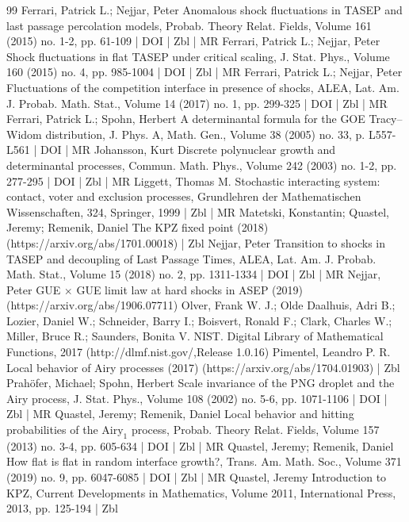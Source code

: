 \begin{thebibliography}{99}
Ferrari, Patrick L.; Nejjar, Peter Anomalous shock fluctuations in TASEP and last passage percolation models, Probab. Theory Relat. Fields, Volume 161 (2015) no. 1-2, pp. 61-109 | DOI | Zbl | MR
Ferrari, Patrick L.; Nejjar, Peter Shock fluctuations in flat TASEP under critical scaling, J. Stat. Phys., Volume 160 (2015) no. 4, pp. 985-1004 | DOI | Zbl | MR
Ferrari, Patrick L.; Nejjar, Peter Fluctuations of the competition interface in presence of shocks, ALEA, Lat. Am. J. Probab. Math. Stat., Volume 14 (2017) no. 1, pp. 299-325 | DOI | Zbl | MR
Ferrari, Patrick L.; Spohn, Herbert A determinantal formula for the GOE Tracy–Widom distribution, J. Phys. A, Math. Gen., Volume 38 (2005) no. 33, p. L557-L561 | DOI | MR
Johansson, Kurt Discrete polynuclear growth and determinantal processes, Commun. Math. Phys., Volume 242 (2003) no. 1-2, pp. 277-295 | DOI | Zbl | MR
Liggett, Thomas M. Stochastic interacting system: contact, voter and exclusion processes, Grundlehren der Mathematischen Wissenschaften, 324, Springer, 1999 | Zbl | MR
Matetski, Konstantin; Quastel, Jeremy; Remenik, Daniel The KPZ fixed point (2018) (https://arxiv.org/abs/1701.00018) | Zbl
Nejjar, Peter Transition to shocks in TASEP and decoupling of Last Passage Times, ALEA, Lat. Am. J. Probab. Math. Stat., Volume 15 (2018) no. 2, pp. 1311-1334 | DOI | Zbl | MR
Nejjar, Peter GUE $\times $ GUE limit law at hard shocks in ASEP (2019) (https://arxiv.org/abs/1906.07711)
Olver, Frank W. J.; Olde Daalhuis, Adri B.; Lozier, Daniel W.; Schneider, Barry I.; Boisvert, Ronald F.; Clark, Charles W.; Miller, Bruce R.; Saunders, Bonita V. NIST. Digital Library of Mathematical Functions, 2017 (http://dlmf.nist.gov/,Release 1.0.16)
Pimentel, Leandro P. R. Local behavior of Airy processes (2017) (https://arxiv.org/abs/1704.01903) | Zbl
Prahöfer, Michael; Spohn, Herbert Scale invariance of the PNG droplet and the Airy process, J. Stat. Phys., Volume 108 (2002) no. 5-6, pp. 1071-1106 | DOI | Zbl | MR
Quastel, Jeremy; Remenik, Daniel Local behavior and hitting probabilities of the $\text{Airy}_1$ process, Probab. Theory Relat. Fields, Volume 157 (2013) no. 3-4, pp. 605-634 | DOI | Zbl | MR
Quastel, Jeremy; Remenik, Daniel How flat is flat in random interface growth?, Trans. Am. Math. Soc., Volume 371 (2019) no. 9, pp. 6047-6085 | DOI | Zbl | MR
Quastel, Jeremy Introduction to KPZ, Current Developments in Mathematics, Volume 2011, International Press, 2013, pp. 125-194 | Zbl

\end{thebibliography}
